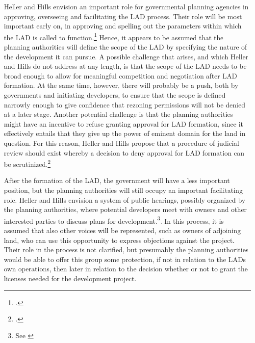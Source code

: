 Heller and Hills envision an important role for governmental planning agencies in approving, overseeing and facilitating the LAD process. Their role will be most important early on, in approving and spelling out the parameters within which the LAD is called to function.\footcite[1489-1491]{heller08} Hence, it appears to be assumed that the planning authorities will define the scope of the LAD by specifying the nature of the development it can pursue. A possible challenge that arises, and which Heller and Hills do not address at any length, is that the scope of the LAD needs to be broad enough to allow for meaningful competition and negotiation after LAD formation. At the same time, however, there will probably be a push, both by governments and initiating developers, to ensure that the scope is defined narrowly enough to give confidence that rezoning permissions will not be denied at a later stage. Another potential challenge is that the planning authorities might have an incentive to refuse granting approval for LAD formation, since it effectively entails that they give up the power of eminent domain for the land in question. For this reason, Heller and Hills propose that a procedure of judicial review should exist whereby a decision to deny approval for LAD formation can be scrutinized.\footcite[1490]{heller08} 

After the formation of the LAD, the government will have a less important position, but the planning authorities will still occupy an important facilitating role. Heller and Hills envision a system of public hearings, possibly organized by the planning authorities, where potential developers meet with owners and other interested parties to discuss  plans for development.\footnote{See \cite[1490-1491]{heller08}}. In this process, it is assumed that also other voices will be represented, such as owners of adjoining land, who can use this opportunity to express objections against the project. Their role in the process is not clarified, but presumably the planning authorities would be able to offer this group some protection, if not in relation to the LADs own operations, then later in relation to the decision whether or not to grant the licenses needed for the development project.

